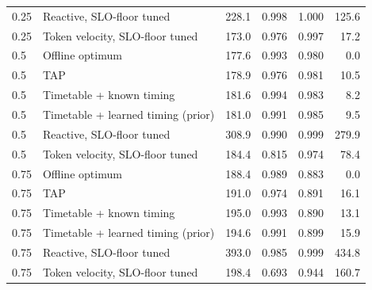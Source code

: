 \begin{tabular}{@{}llrrrr@{}}
0.25 & Reactive, SLO-floor tuned & 228.1 & 0.998 & 1.000 & 125.6 \\
0.25 & Token velocity, SLO-floor tuned & 173.0 & 0.976 & 0.997 & 17.2 \\
0.5 & Offline optimum & 177.6 & 0.993 & 0.980 & 0.0 \\
0.5 & TAP & 178.9 & 0.976 & 0.981 & 10.5 \\
0.5 & Timetable + known timing & 181.6 & 0.994 & 0.983 & 8.2 \\
0.5 & Timetable + learned timing (prior) & 181.0 & 0.991 & 0.985 & 9.5 \\
0.5 & Reactive, SLO-floor tuned & 308.9 & 0.990 & 0.999 & 279.9 \\
0.5 & Token velocity, SLO-floor tuned & 184.4 & 0.815 & 0.974 & 78.4 \\
0.75 & Offline optimum & 188.4 & 0.989 & 0.883 & 0.0 \\
0.75 & TAP & 191.0 & 0.974 & 0.891 & 16.1 \\
0.75 & Timetable + known timing & 195.0 & 0.993 & 0.890 & 13.1 \\
0.75 & Timetable + learned timing (prior) & 194.6 & 0.991 & 0.899 & 15.9 \\
0.75 & Reactive, SLO-floor tuned & 393.0 & 0.985 & 0.999 & 434.8 \\
0.75 & Token velocity, SLO-floor tuned & 198.4 & 0.693 & 0.944 & 160.7 \\
\bottomrule
\end{tabular}
